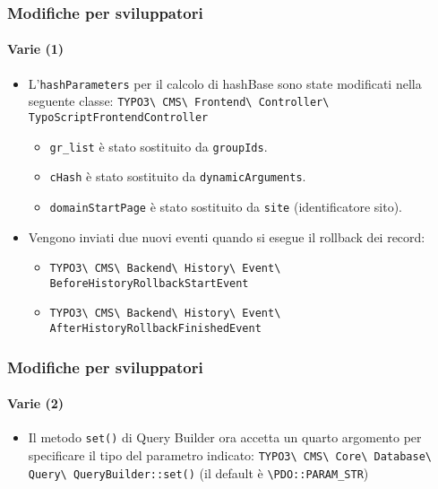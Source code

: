 \begin{frame}[fragile]
	\frametitle{Modifiche per sviluppatori}
	\framesubtitle{Varie (1)}

	\begin{itemize}
		\item L'\texttt{hashParameters} per il calcolo di hashBase sono state modificati nella seguente classe:\newline
			\small
				\texttt{TYPO3\textbackslash
					CMS\textbackslash
					Frontend\textbackslash
					Controller\textbackslash
					TypoScriptFrontendController}
			\normalsize

			\begin{itemize}
				\item \texttt{gr\_list} è stato sostituito da \texttt{groupIds}.
				\item \texttt{cHash} è stato sostituito da \texttt{dynamicArguments}.
				\item \texttt{domainStartPage} è stato sostituito da \texttt{site} (identificatore sito).
			\end{itemize}

		\item Vengono inviati due nuovi eventi quando si esegue il rollback dei record:

			\begin{itemize}\smaller
				\item \texttt{TYPO3\textbackslash
					CMS\textbackslash
					Backend\textbackslash
					History\textbackslash
					Event\textbackslash
					BeforeHistoryRollbackStartEvent}
				\item \texttt{TYPO3\textbackslash
					CMS\textbackslash
					Backend\textbackslash
					History\textbackslash
					Event\textbackslash
					AfterHistoryRollbackFinishedEvent}
			\end{itemize}\normalsize

	\end{itemize}

\end{frame}


\begin{frame}[fragile]
	\frametitle{Modifiche per sviluppatori}
	\framesubtitle{Varie (2)}

	\begin{itemize}
		\item Il metodo \texttt{set()} di Query Builder ora accetta un quarto argomento
			per specificare il tipo del parametro indicato:\newline
			\small
				\texttt{TYPO3\textbackslash
					CMS\textbackslash
					Core\textbackslash
					Database\textbackslash
					Query\textbackslash
					QueryBuilder::set()}
			\normalsize\newline
			\vspace{0.2cm}
			(il default è \texttt{\textbackslash PDO::PARAM\_STR})

	\end{itemize}

\end{frame}

